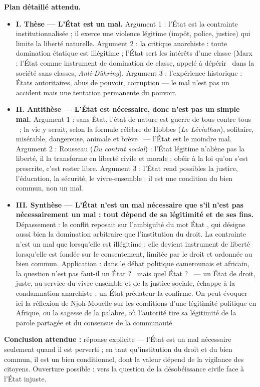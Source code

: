 \documentclass[11pt]{article}
\begin{document}
\begin{corrige}
\textbf{Plan détaillé attendu.}
\begin{itemize}
\item \textbf{I. Thèse --- L'État est un mal.} Argument 1 : l'État est la contrainte institutionnalisée ; il exerce une violence légitime (impôt, police, justice) qui limite la liberté naturelle. Argument 2 : la critique anarchiste : toute domination étatique est illégitime ; l'État sert les intérêts d'une classe (Marx : l'État comme instrument de domination de classe, appelé à \guillemotleft dépérir \guillemotright\ dans la société sans classes, \emph{Anti-Dühring}). Argument 3 : l'expérience historique : États autoritaires, abus de pouvoir, corruption --- le mal n'est pas un accident mais une tentation permanente du pouvoir.
\item \textbf{II. Antithèse --- L'État est nécessaire, donc n'est pas un simple mal.} Argument 1 : sans État, l'état de nature est \guillemotleft guerre de tous contre tous \guillemotright\ ; la vie y serait, selon la formule célèbre de Hobbes (\emph{Le Léviathan}), \guillemotleft solitaire, misérable, dangereuse, animale et brève \guillemotright\ --- l'État est le moindre mal. Argument 2 : Rousseau (\emph{Du contrat social}) : l'État légitime n'aliène pas la liberté, il la transforme en liberté civile et morale ; obéir à la loi qu'on s'est prescrite, c'est rester libre. Argument 3 : l'État rend possibles la justice, l'éducation, la sécurité, le vivre-ensemble : il est une condition du bien commun, non un mal.
\item \textbf{III. Synthèse --- L'État n'est un mal nécessaire que s'il n'est pas nécessairement un mal : tout dépend de sa légitimité et de ses fins.} Dépassement : le conflit reposait sur l'ambiguïté du mot \guillemotleft État \guillemotright, qui désigne aussi bien la domination arbitraire que l'institution du droit. La contrainte n'est un mal que lorsqu'elle est illégitime ; elle devient instrument de liberté lorsqu'elle est fondée sur le consentement, limitée par le droit et ordonnée au bien commun. Application : dans le débat politique camerounais et africain, la question n'est pas \guillemotleft faut-il un État ? \guillemotright\ mais \guillemotleft quel État ? \guillemotright\ --- un État de droit, juste, au service du vivre-ensemble et de la justice sociale, échappe à la condamnation anarchiste ; un État prédateur la confirme. On peut évoquer ici la réflexion de Njoh-Mouelle sur les conditions d'une légitimité politique en Afrique, ou la sagesse de la palabre, où l'autorité tire sa légitimité de la parole partagée et du consensus de la communauté.
\end{itemize}
\textbf{Conclusion attendue :} réponse explicite --- l'État est un mal nécessaire seulement quand il est perverti ; en tant qu'institution du droit et du bien commun, il est un bien conditionnel, dont la valeur dépend de la vigilance des citoyens. Ouverture possible : vers la question de la désobéissance civile face à l'État injuste.


\end{corrige}
\end{document}
